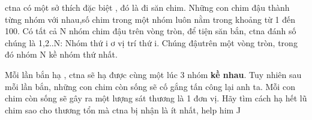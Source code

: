 ctna có một sở thích đặc biệt , đó là đi săn chim. Những con chim đậu thành từng nhóm với nhau,số chim trong một nhóm luôn nằm trong khoảng từ 1 đến 100. Có tất cả N nhóm chim đậu trên vòng tròn, để tiện săn bắn, ctna đánh số chúng là 1,2..N: Nhóm thứ i ơ vị trí thứ i. Chúng đậutrên một vòng tròn, trong đó nhóm N kề nhóm thứ nhất.

Mỗi lần bắn hạ , ctna sẽ hạ được cùng một lúc 3 nhóm \textbf{ kề nhau}. Tuy nhiên sau mỗi lần bắn, những con chim còn sống sẽ cố gắng tấn công lại anh ta. Mỗi con chim còn sống sẽ gây ra một lượng sát thương là 1 đơn vị. Hãy tìm cách hạ hết lũ chim sao cho thương tổn mà ctna bị nhận là ít nhất, help him ^^